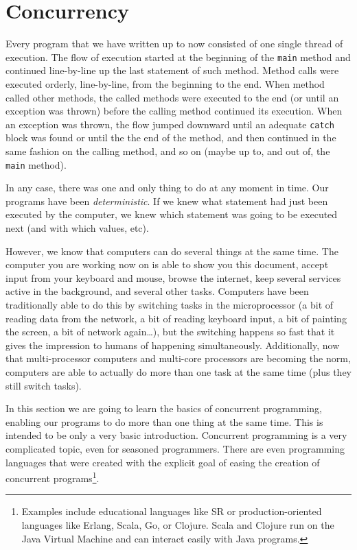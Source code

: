 \section{Concurrency}
\label{sec:concurrency}

Every program that we have written up to now consisted of one single
thread of execution. The flow of execution started at the beginning of
the \verb+main+ method and continued line-by-line up the last
statement of such method. Method calls were executed orderly,
line-by-line, from the beginning to the end. When method called other
methods, the called methods were executed to the end (or until an
exception was thrown) before the calling method continued its
execution. When an exception was thrown, the flow jumped downward
until an adequate \verb+catch+ block was found or until the the end of
the method, and then continued in the same fashion on the calling
method, and so on (maybe up to, and out of, the \verb+main+ method). 

In any case, there was one and only thing to do at any moment in
time. Our programs have been \emph{deterministic}. If we knew what
statement had just been executed by the computer, we knew which
statement was going to be executed next (and with which values, etc). 

However, we know that computers can do several things at the same
time. The computer you are working now on is able to show you this
document, accept input from your keyboard and mouse, browse the
internet, keep several services active in the background, and several
other tasks. Computers have been traditionally able to do this by
switching tasks in the microprocessor (a bit of reading data from the
network, a bit of reading keyboard input, a bit of painting the
screen, a bit of network again\ldots), but the switching happens so
fast that it gives the impression to humans of happening
simultaneously. Additionally, now that multi-processor computers and
multi-core processors are becoming the norm, computers are able to
actually do more than one task at the same time (plus they still
switch tasks).

In this section we are going to learn the basics of concurrent
programming, enabling our programs to do more than one thing at the
same time. This is intended to be only a very basic
introduction. Concurrent programming is a very complicated topic, even
for seasoned programmers. There are even programming languages that
were created with the explicit goal of easing the creation of concurrent
programs\footnote{Examples include educational languages like SR or
  production-oriented languages like Erlang, Scala, Go, or
  Clojure. Scala and Clojure run on the Java Virtual Machine and can
  interact easily with Java programs.}. 

